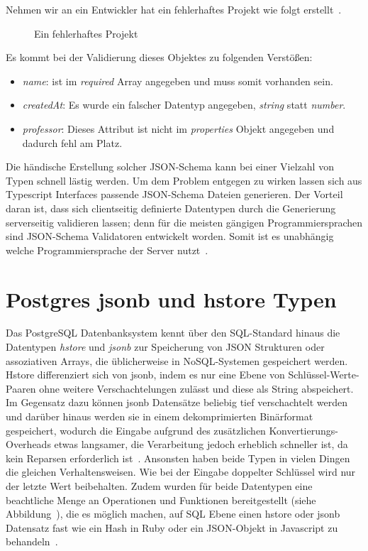 Nehmen wir an ein Entwickler hat ein fehlerhaftes Projekt wie folgt erstellt~.

\begin{figure}[hb!]
    
    \caption{Ein fehlerhaftes Projekt}
    \label{fig:basics:jsonschema:3}
\end{figure}

Es kommt bei der Validierung dieses Objektes zu folgenden Verstößen:

\begin{itemize}
    \setlength\itemsep{-1em}
    \item \emph{name}: ist im \emph{required} Array angegeben und muss somit vorhanden sein.
    \item \emph{createdAt}: Es wurde ein falscher Datentyp angegeben, \emph{string} statt \emph{number}.
    \item \emph{professor}: Dieses Attribut ist nicht im \emph{properties} Objekt angegeben und dadurch fehl am Platz.
\end{itemize}

Die händische Erstellung solcher JSON-Schema kann bei einer Vielzahl von Typen schnell lästig werden.
Um dem Problem entgegen zu wirken lassen sich aus Typescript Interfaces passende JSON-Schema Dateien generieren.
Der Vorteil daran ist, dass sich clientseitig definierte Datentypen durch die Generierung serverseitig validieren lassen;
denn für die meisten gängigen Programmiersprachen sind JSON-Schema Validatoren entwickelt worden.
Somit ist es unabhängig welche Programmiersprache der Server nutzt~\cite{json-schema-implementations}.


\section{Postgres jsonb und hstore Typen}
\label{sec:basics:postgres}
Das PostgreSQL Datenbanksystem kennt über den SQL-Standard hinaus die Datentypen \emph{hstore} und \emph{jsonb} zur Speicherung von JSON Strukturen oder assoziativen Arrays,
die üblicherweise in NoSQL-Systemen gespeichert werden.
Hstore differenziert sich von jsonb, indem es nur eine Ebene von Schlüssel-Werte-Paaren ohne weitere Verschachtelungen zulässt und
diese als String abspeichert.
Im Gegensatz dazu können jsonb Datensätze beliebig tief verschachtelt werden und
darüber hinaus werden sie in einem dekomprimierten Binärformat gespeichert, wodurch die Eingabe aufgrund des zusätzlichen Konvertierungs-Overheads etwas langsamer,
die Verarbeitung jedoch erheblich schneller ist, da kein Reparsen erforderlich ist~\cite{postgresql-json}.
Ansonsten haben beide Typen in vielen Dingen die gleichen Verhaltensweisen. Wie bei der Eingabe doppelter Schlüssel wird nur der letzte Wert beibehalten.
Zudem wurden für beide Datentypen eine beachtliche Menge an Operationen und Funktionen bereitgestellt (siehe Abbildung~), die es möglich machen,
auf SQL Ebene einen hstore oder jsonb Datensatz fast wie ein Hash in Ruby oder ein JSON-Objekt in Javascript zu behandeln~\cite{postgresql-hstore}.

